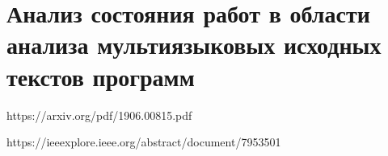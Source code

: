 \section{Анализ состояния работ в области анализа мультиязыковых исходных текстов программ}

https://arxiv.org/pdf/1906.00815.pdf

https://ieeexplore.ieee.org/abstract/document/7953501

\clearpage